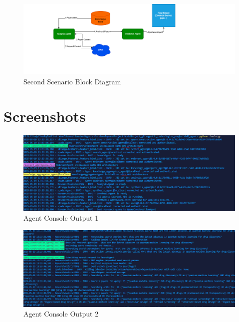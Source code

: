 \documentclass{article}
\begin{document}
\begin{figure}[H]
    \centering
    \includegraphics[width=\textwidth]{images/agents.drawio.png}
    \caption{Second Scenario Block Diagram}
    \label{fig:Second-Scenario}
\end{figure}



\section*{Screenshots}

\begin{figure}[H]
    \centering
    \includegraphics[width=\textwidth]{images/Screenshot_1.png}
    \caption{Agent Console Output 1}
    \label{fig:screenshot1}
\end{figure}

\begin{figure}[H]
    \centering
    \includegraphics[width=\textwidth]{images/Screenshot_2.png}
    \caption{Agent Console Output 2}
    \label{fig:screenshot2}
\end{figure}
\end{document}
